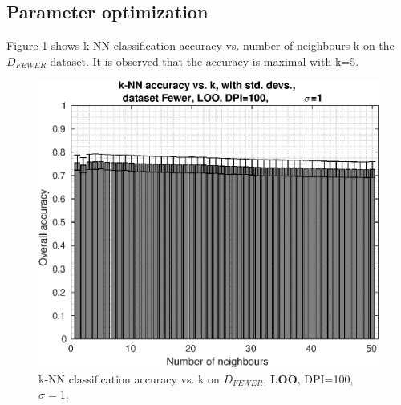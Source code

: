 \subsection{Parameter optimization}
Figure \ref{fig:pca-knn-acc-vs-k} shows k-NN classification
accuracy vs. number of neighbours k on the \(D_{FEWER}\) dataset.
It is observed that the accuracy is maximal with k=5.
\begin{figure}[ht]
\centering
\includegraphics[width=\figscale]{img/pca-knn-acc-vs-k-dpi100-sigma1}
\caption[k-NN classification accuracy vs. k on $D_{FEWER}$, \textbf{LOO}.]
{
k-NN classification accuracy vs. k on $D_{FEWER}$, \textbf{LOO}, DPI=100, $\sigma=1$.
}
\label{fig:pca-knn-acc-vs-k}
\end{figure}

